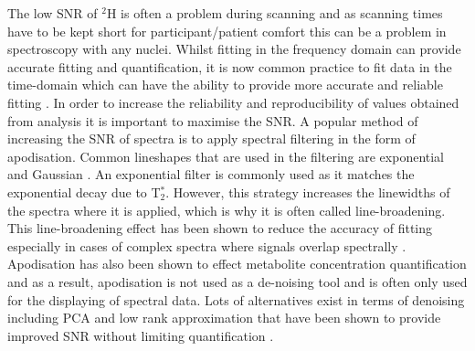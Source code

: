 The low \ac{SNR} of $^2$H is often a problem during scanning and as scanning times have to be kept short for participant/patient comfort this can be a problem in spectroscopy with any nuclei. Whilst fitting in the frequency domain can provide accurate fitting and quantification, it is now common practice to fit data in the time-domain which can have the ability to provide more accurate and reliable fitting \cite{Joliot1991InMethods}. In order to increase the reliability and reproducibility of values obtained from analysis it is important to maximise the \ac{SNR}. A popular method of increasing the \ac{SNR} of spectra is to apply spectral filtering in the form of apodisation. Common lineshapes that are used in the filtering are exponential and Gaussian \cite{Goryawala2020EffectsFitting}. An exponential filter is commonly used as it matches the exponential decay due to T$_2^*$. However, this strategy increases the linewidths of the spectra where it is applied, which is why it is often called line-broadening. This line-broadening effect has been shown to reduce the accuracy of fitting especially in cases of complex spectra where signals overlap spectrally \cite{Bartha1999FactorsFiltering}. Apodisation has also been shown to effect metabolite concentration quantification \cite{Goryawala2020EffectsFitting} and as a result, apodisation is not used as a de-noising tool and is often only used for the displaying of spectral data. Lots of alternatives exist in terms of denoising including \ac{PCA} \cite{Abdoli2016DenoisingComponents} and low rank approximation \cite{Nguyen2013DenoisingApproximations} that have been shown to provide improved \ac{SNR} without limiting quantification \cite{Clarke2022UncertaintyMethods}. 


